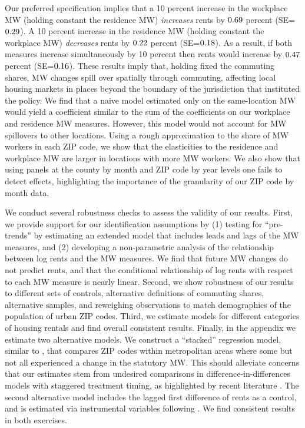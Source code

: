 
Our preferred specification implies that 
a 10 percent increase in the workplace MW (holding constant the residence MW) 
\textit{increases} rents by $0.69$ percent 
(SE=$0.29$).
A 10 percent increase in the residence MW (holding constant the workplace MW) 
\textit{decreases} rents by $0.22$ percent 
(SE=$0.18$). 
As a result, if both measures increase simultaneously by 10 percent then 
rents would increase by $0.47$ percent 
(SE=$0.16$).
These results imply that, holding fixed the commuting shares, MW 
changes spill over spatially through commuting, affecting local housing markets 
in places beyond the boundary of the jurisdiction that instituted the policy.
We find that a naive model estimated only on the same-location MW would yield a 
coefficient similar to the sum of the coefficients on our workplace and 
residence MW measures.
However, this model would not account for MW spillovers to other locations.
Using a rough approximation to the share of MW workers in each ZIP code, we show 
that the elasticities to the residence and workplace MW are larger in locations 
with more MW workers.
We also show that using panels at the county by month and ZIP code by year levels 
one fails to detect effects, highlighting the importance of the granularity of 
our ZIP code by month data.


We conduct several robustness checks to assess the validity of our results.
First, we provide support for our identification assumptions by
(1) testing for ``pre-trends'' by estimating an extended model that includes 
leads and lags of the MW measures, and 
(2) developing a non-parametric analysis of the relationship between log rents
and the MW measures.
We find that future MW changes do not predict rents, and that the conditional
relationship of log rents with respect to each MW measure is nearly linear.
Second, we show robustness of our results to different sets of controls,
alternative definitions of commuting shares, alternative samples,
and reweighing observations to match demographics of the population of
urban ZIP codes.
Third, we estimate models for different categories of housing rentals and
find overall consistent results.
Finally, in the appendix we estimate two alternative models.
We construct a ``stacked'' regression model, similar to \textcite{CegnizEtAl2019},
that compares ZIP codes within metropolitan areas where some but not all 
experienced a change in the statutory MW.
This should alleviate concerns that our estimates stem from undesired 
comparisons in difference-in-differences models with staggered treatment 
timing, as highlighted by recent literature 
\parencite{deChaisemartinEtAl2022,RothEtAl2022}.
The second alternative model includes the lagged first difference of rents 
as a control, and is estimated via instrumental variables following 
\textcite{ArellanoBond1991}.
We find consistent results in both exercises.


